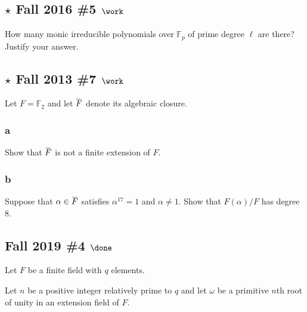 \hypertarget{star-fall-2016-5-work}{%
\subsection{\texorpdfstring{\(\star\) Fall 2016 \#5
\(\work\)}{\textbackslash star Fall 2016 \#5 \textbackslash work}}\label{star-fall-2016-5-work}}

How many monic irreducible polynomials over \({\mathbb{F}}_p\) of prime
degree \(\ell\) are there? Justify your answer.

\hypertarget{star-fall-2013-7-work}{%
\subsection{\texorpdfstring{\(\star\) Fall 2013 \#7
\(\work\)}{\textbackslash star Fall 2013 \#7 \textbackslash work}}\label{star-fall-2013-7-work}}

Let \(F = {\mathbb{F}}_2\) and let
\(\mkern 1.5mu\overline{\mkern-1.5muF\mkern-1.5mu}\mkern 1.5mu\) denote
its algebraic closure.

\hypertarget{a-50}{%
\subsubsection{a}\label{a-50}}

Show that
\(\mkern 1.5mu\overline{\mkern-1.5muF\mkern-1.5mu}\mkern 1.5mu\) is not
a finite extension of \(F\).

\hypertarget{b-40}{%
\subsubsection{b}\label{b-40}}

Suppose that
\(\alpha \in \mkern 1.5mu\overline{\mkern-1.5muF\mkern-1.5mu}\mkern 1.5mu\)
satisfies \(\alpha^{17} = 1\) and \(\alpha\neq 1\). Show that
\(F(\alpha)/F\) has degree 8.

\hypertarget{fall-2019-4-done}{%
\subsection{\texorpdfstring{Fall 2019 \#4
\(\done\)}{Fall 2019 \#4 \textbackslash done}}\label{fall-2019-4-done}}

Let \(F\) be a finite field with \(q\) elements.

Let \(n\) be a positive integer relatively prime to \(q\) and let
\(\omega\) be a primitive \(n\)th root of unity in an extension field of
\(F\).

